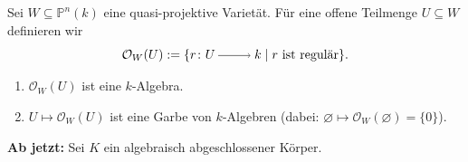 \documentclass[a4paper,12pt,index=toc]{scrbook}
\theoremstyle{keinenummern} %
\def\O{\mathcal{O}}
\def\P{\mathbb{P}}
\newcommand{\leer}{\ensuremath{\varnothing}}
\begin{document}
\begin{db}\label{2.5.3}
Sei $W\subseteq\P^{n}(k)$ eine quasi-projektive Varietät. Für eine offene Teilmenge $U\subseteq W$ definieren wir 
\begin{equation*}\O_{W}(U):=\{r\colon U\ra k\mid r\text{ ist regulär}\}.\end{equation*}
\begin{enumerate}
\item $\O_{W}(U)$ ist eine $k$-Algebra.
\item $U\mapsto\O_{W}(U)$ ist eine Garbe von $k$-Algebren (dabei: $\leer\mapsto\O_{W}(\leer)=\{0\}$).
\end{enumerate}\end{db}

\begin{w}
{\bf Ab jetzt:} Sei $K$ ein algebraisch abgeschlossener Körper.
\end{w}
\end{document}
